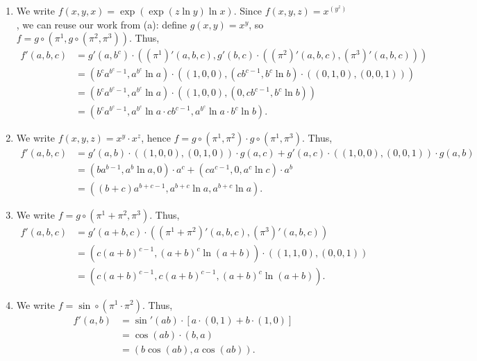 \documentclass[11pt]{report}
\begin{document}
\begin{enumerate}
        \item We write $f(x, y, x) = \exp(\exp(z\ln{y})\ln{x})$. Since $f(x, y, z) =
        x^{(y^z)}$, we can reuse our work from (a): define $g(x, y) = x^y$, so $f =
        g\circ (\pi^1, g \circ (\pi^2, \pi^3))$. Thus, \begin{align*}
            f'(a, b, c) &= g'(a, b^c) \cdot ((\pi^1)'(a, b, c), g'(b, c) \cdot
            ((\pi^2)'(a, b, c), (\pi^3)'(a, b, c))) \\
            &= (b^c a^{b^c - 1}, a^{b^c}\ln{a}) \cdot ((1, 0, 0), (cb^{c - 1},
            b^c\ln{b}) \cdot ((0, 1, 0), (0, 0, 1))) \\
            &= (b^c a^{b^c - 1}, a^{b^c}\ln{a}) \cdot ((1, 0, 0), (0, cb^{c - 1},
            b^c\ln{b})) \\
            &= (b^c a^{b^c - 1}, a^{b^c}\ln{a}\cdot cb^{c - 1}, a^{b^c}\ln{a}\cdot
            b^c \ln{b}).
        \end{align*}

        \item We write $f(x, y, z) = x^y\cdot x^z$, hence $f = g\circ(\pi^1, \pi^2)
        \cdot g\circ (\pi^1, \pi^3)$. Thus, \begin{align*}
            f'(a, b, c) &= g'(a, b)\cdot ((1, 0, 0), (0, 1, 0)) \cdot g(a, c) + g'(a,
            c)\cdot ((1, 0, 0), (0, 0, 1)) \cdot g(a, b) \\
            &= (ba^{b - 1}, a^b\ln{a}, 0)\cdot a^c + (ca^{c - 1}, 0, a^c\ln{c})\cdot
            a^b \\
            &= ((b + c) a^{b + c - 1}, a^{b + c}\ln{a}, a^{b + c}\ln{a}).
        \end{align*}

        \item We write $f = g\circ (\pi^1 + \pi^2, \pi^3)$. Thus, \begin{align*}
            f'(a, b, c) &= g'(a + b, c) \cdot ((\pi^1 + \pi^2)'(a, b, c), (\pi^3)'(a,
            b, c)) \\
            &= (c(a + b)^{c - 1}, (a + b)^c\ln(a + b)) \cdot ((1, 1, 0), (0, 0, 1))
            \\
            &= (c(a + b)^{c - 1}, c(a + b)^{c - 1}, (a + b)^c\ln(a + b)).
        \end{align*}

        \item We write $f = \sin \circ (\pi^1 \cdot \pi^2)$. Thus, \begin{align*}
            f'(a, b) &= \sin'(ab) \cdot [a\cdot(0, 1) + b\cdot (1, 0)] \\
            &= \cos(ab) \cdot (b, a) \\
            &= (b\cos(ab), a\cos(ab)).
        \end{align*}


\end{enumerate}
\end{document}
